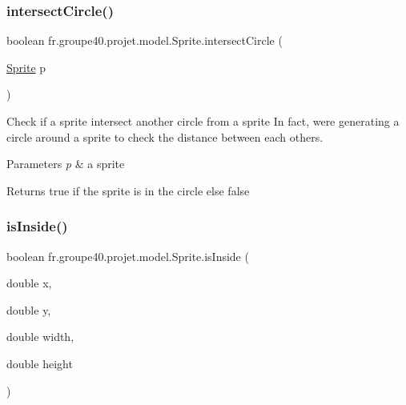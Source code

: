 \subsubsection{\texorpdfstring{intersect\+Circle()}{intersectCircle()}\hspace{0.1cm}{\footnotesize\ttfamily [2/2]}}
{\footnotesize\ttfamily boolean fr.\+groupe40.\+projet.\+model.\+Sprite.\+intersect\+Circle (\begin{DoxyParamCaption}\item[{\hyperlink{classfr_1_1groupe40_1_1projet_1_1model_1_1_sprite}{Sprite}}]{p }\end{DoxyParamCaption})}



Check if a sprite intersect another circle from a sprite In fact, we\textquotesingle{}re generating a circle around a sprite to check the distance between each others. 


\begin{DoxyParams}{Parameters}
{\em p} & a sprite \\
\hline
\end{DoxyParams}
\begin{DoxyReturn}{Returns}
true if the sprite is in the circle else false 
\end{DoxyReturn}
\mbox{\label{classfr_1_1groupe40_1_1projet_1_1model_1_1_sprite_a7c826b664373d244725751f74c057b12}} 
\subsubsection{\texorpdfstring{is\+Inside()}{isInside()}\hspace{0.1cm}{\footnotesize\ttfamily [1/2]}}
{\footnotesize\ttfamily boolean fr.\+groupe40.\+projet.\+model.\+Sprite.\+is\+Inside (\begin{DoxyParamCaption}\item[{double}]{x,  }\item[{double}]{y,  }\item[{double}]{width,  }\item[{double}]{height }\end{DoxyParamCaption})}



